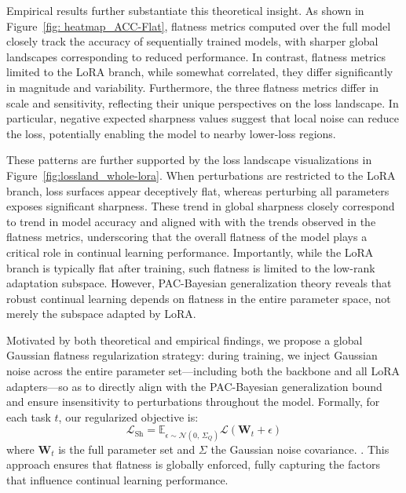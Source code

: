 \documentclass[letterpaper]{article} %
\begin{document}
Empirical results further substantiate this theoretical insight. As shown in Figure~\ref{fig: heatmap_ACC-Flat}, flatness metrics computed over the full model closely track the accuracy of sequentially trained models, with sharper global landscapes corresponding to reduced performance. In contrast, flatness metrics limited to the LoRA branch, while somewhat correlated, they differ significantly in magnitude and variability.  Furthermore, the three flatness metrics differ in scale and sensitivity, reflecting their unique perspectives on the loss landscape. In particular, negative expected sharpness values suggest that local noise can reduce the loss, potentially enabling the model to nearby lower-loss regions.



These patterns are further supported by the loss landscape visualizations in Figure~\ref{fig:lossland_whole-lora}. When perturbations are restricted to the LoRA branch, loss surfaces appear deceptively flat, whereas perturbing all parameters exposes significant sharpness. These trend in global sharpness closely correspond to trend in model accuracy and aligned with with the trends observed in the flatness metrics, underscoring that the overall flatness of the model plays a critical role in continual learning performance. Importantly, while the LoRA branch is typically flat after training, such flatness is limited to the low-rank adaptation subspace. However, PAC-Bayesian generalization theory reveals that robust continual learning depends on flatness in the entire parameter space, not merely the subspace adapted by LoRA.





Motivated by both theoretical and empirical findings, we propose a global Gaussian flatness regularization strategy: during training, we inject Gaussian noise across the entire parameter set—including both the backbone and all LoRA adapters—so as to directly align with the PAC-Bayesian generalization bound and ensure insensitivity to perturbations throughout the model.  Formally, for each task $t$, our regularized objective is:
\begin{equation}
    \mathcal{L}_{\text{Sh}} = \mathbb{E}_{\epsilon \sim \mathcal{N}(0,\,\Sigma_Q)}\mathcal{L}({\mathbf{W}_t+\epsilon}) 
\end{equation}
where $\mathbf{W}_t$ is the full parameter set and $\Sigma$ the Gaussian noise covariance. . This approach ensures that flatness is globally enforced, fully capturing the factors that influence continual learning performance.
\end{document}
